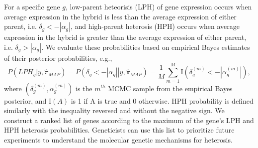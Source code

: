 \documentclass[useAMS,usenatbib,referee]{biom}
\begin{document}
For a specific gene $g$, low-parent heteorisis (LPH) of gene expression occurs when average expression in the hybrid is less than the average expression of either parent, i.e. $\delta_g < -|\alpha_g|$, and high-parent heterosis (HPH) occurs when average expression in the hybrid is greater than the average expression of either parent, i.e. $\delta_g > |\alpha_g|$. 
We evaluate these probabilities based on empirical Bayes estimates of their posterior probabilities, e.g., 
\begin{equation}
P(LPH_g|y,\hat{\pi}_{MAP}) = P\left(\left.\delta_g < -|\alpha_g|\right|y, \hat{\pi}_{MAP}\right) = \frac{1}{M} \sum_{m=1}^M \mathrm{I}\left(\delta_g^{(m)} < -\left|\alpha_g^{(m)}\right|\right), 
\label{e:probs}
\end{equation}
where $\left(\delta_g^{(m)},\alpha_g^{(m)}\right)$ is the $m^{th}$ MCMC sample from the empirical Bayes posterior, and $\mathrm{I}(A)$ is 1 if A is true and 0 otherwise. HPH probability is defined similarly with the inequality reversed and without the negative sign. We construct a ranked list of genes according to the maximum of the gene's LPH and HPH heterosis probabilities. Geneticists can use this list to prioritize future experiments to understand the molecular genetic mechanisms for heterosis.  
 
\end{document}
